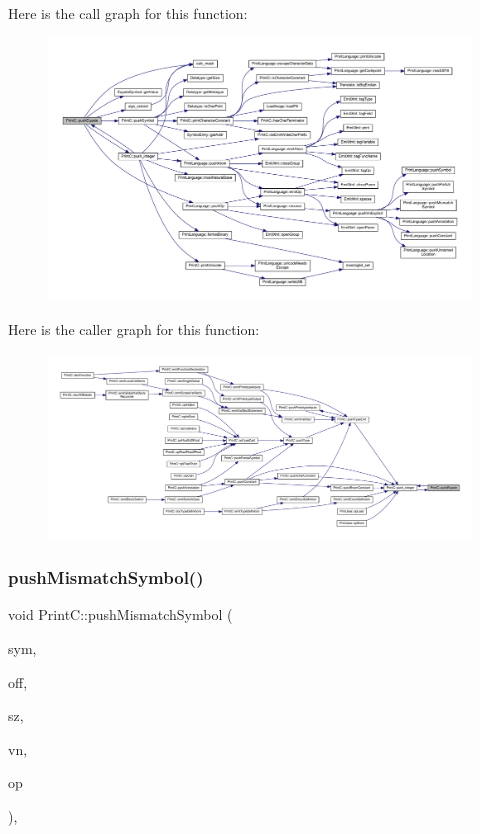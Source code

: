 Here is the call graph for this function\+:
\nopagebreak
\begin{figure}[H]
\begin{center}
\leavevmode
\includegraphics[width=350pt]{class_print_c_ae236127c4e6ea51836f881210aa59ec5_cgraph}
\end{center}
\end{figure}
Here is the caller graph for this function\+:
\nopagebreak
\begin{figure}[H]
\begin{center}
\leavevmode
\includegraphics[width=350pt]{class_print_c_ae236127c4e6ea51836f881210aa59ec5_icgraph}
\end{center}
\end{figure}
\mbox{\label{class_print_c_aaa8e530589a3d446db8f76b9a211f0fa}} 
\subsubsection{\texorpdfstring{pushMismatchSymbol()}{pushMismatchSymbol()}}
{\footnotesize\ttfamily void Print\+C\+::push\+Mismatch\+Symbol (\begin{DoxyParamCaption}\item[{const \mbox{\hyperlink{class_symbol}{Symbol}} $\ast$}]{sym,  }\item[{int4}]{off,  }\item[{int4}]{sz,  }\item[{const \mbox{\hyperlink{class_varnode}{Varnode}} $\ast$}]{vn,  }\item[{const \mbox{\hyperlink{class_pcode_op}{Pcode\+Op}} $\ast$}]{op }\end{DoxyParamCaption})\hspace{0.3cm}{\ttfamily [protected]}, {\ttfamily [virtual]}}



